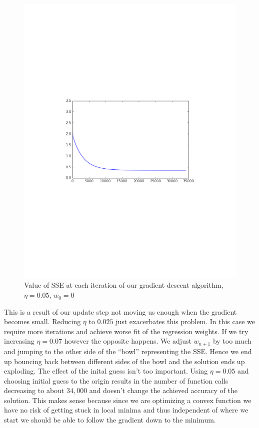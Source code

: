 \documentclass{article}
\begin{document}
\begin{figure}[h]
\centering
\includegraphics[scale=0.5]{lin-reg-fig-1}
\caption{Value of SSE at each iteration of our gradient descent algorithm, $\eta = 0.05$, $w_0 = 0$}
\label{grad-descent-iterations}

\end{figure}

This is a result of our update step not moving us enough when the gradient becomes small. Reducing $\eta$ to $0.025$ just exacerbates this problem. In this case we require more iterations and achieve worse fit of the regression weights. If we try increasing $\eta = 0.07$ however the opposite happens. We adjust $w_{n+1}$ by too much and jumping to the other side of the ``bowl'' representing the SSE. Hence we end up bouncing back between different sides of the bowl and the solution ends up exploding. The effect of the inital guess isn't too important. Using $\eta = 0.05$ and choosing initial guess to the origin results in the number of function calls decreasing to about $34,000$ and doesn't change the achieved accuracy of the solution. This makes sense because since we are optimizing a convex function we have no risk of getting stuck in local minima and thus independent of where we start we should be able to follow the gradient down to the minimum.
\end{document}
